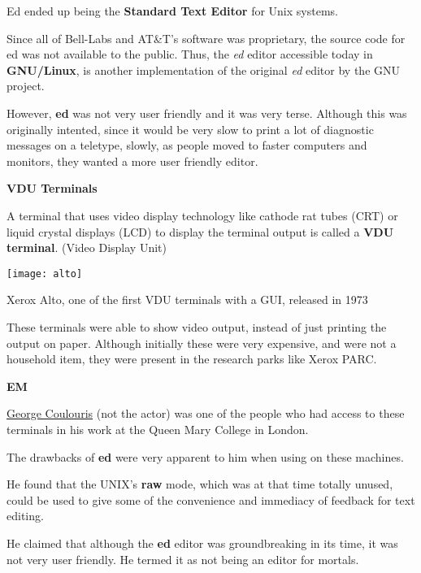 Ed ended up being the \textbf{Standard Text Editor} for Unix systems.

\begin{remark}
Since all of Bell-Labs and AT\&T's software was proprietary, the source code for ed was not available to the public.
Thus, the \textit{ed} editor accessible today in \textbf{GNU/Linux},
is another implementation of the original \textit{ed} editor
by the GNU project.
\end{remark}

However, \textbf{ed} was not very user friendly and it was very terse.
Although this was originally intented, since it would be
very slow to print a lot of diagnostic messages on a teletype,
slowly, as people moved to faster computers and monitors,
they wanted a more user friendly editor.

\textbf{VDU Terminals}

\begin{definition}
  A terminal that uses video display technology like
  cathode rat tubes (CRT) or liquid crystal displays (LCD)
  to display the terminal output is called a \textbf{VDU terminal}.
  (Video Display Unit)
\end{definition}

\begin{marginfigure}
  \texttt{[image: alto]}
  \caption{Xerox Alto, one of the first VDU terminals with a GUI, released in 1973}
\end{marginfigure}

These terminals were able to show video output, instead of
just printing the output on paper.
Although initially these were very expensive, and were not
a household item, they were present in the research parks
like Xerox PARC.

\textbf{EM}

\href{https://en.wikipedia.org/wiki/George\_Coulouris\_(computer\_scientist)}{George Coulouris}
(not the actor)
was one of the people who had access to these terminals
in his work at the Queen Mary College in London.

The drawbacks of \textbf{ed} were very apparent to him
when using on these machines.

He found that the UNIX's \textbf{raw} mode, which was
at that time totally unused,
could be used to give some of the convenience
and immediacy of feedback for text editing.

He claimed that although the \textbf{ed} editor was
groundbreaking in its time, it was not very user friendly.
He termed it as not being an editor for mortals.


